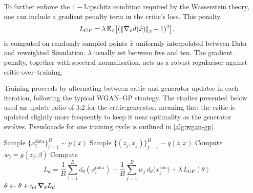 {{        To further enforce the \(1-\)Lipschitz condition required by the Wasserstein theory, one can include a gradient penalty term in the critic’s loss.
        This penalty,
        \[
            L_{GP} = \lambda\,\mathbb{E}_{\hat{x}}\qty[(\norm{\nabla_{\hat{x}}d(\hat{x})}_2 - 1)^2],
        \]
        is computed on randomly sampled points $\hat{x}$ uniformly interpolated between Data and reweighted Simulation.
        $\lambda$ usually set between five and ten.
        The gradient penalty, together with spectral normalisation, acts as a robust regulariser against critic over--training.

        Training proceeds by alternating between critic and generator updates in each iteration, following the typical WGAN--GP strategy.
        The studies presented below used an update ratio of 3:2 for the critic:generator, meaning that the critic is updated slightly more frequently to keep it near optimality as the generator evolves.
        Pseudocode for one training cycle is outlined in \cref{alg:wgan-gp}.

\begin{algorithm}
    \caption{WGAN GP Training Step}
    \label{alg:wgan-gp}
    \begin{algorithmic}
    \algospacing
      \State {}
        \State Sample $\{x_i^{\text{data}}\}_{i=1}^B\sim p(x)$
        \State Sample $\{(z_j, x_j)\}_{j=1}^B\sim q(z, x)$
        \State Compute $w_j = g(z_j;\beta)$
        \State Compute
        \[
          L_d
          = \frac1B\sum_{i=1}^B d_{\theta}(x_i^{\text{data}})
            -\frac1B\sum_{j=1}^B w_j\,d_{\theta}\bigl(x^{\text{sim}}_j\bigr)
            +\lambda\,L_{\text{GP}}(\theta)
        \]
        \State $\theta \leftarrow\theta + \eta_d\,\grad_{\theta}L_d$    
      \EndFor
    \EndFor
    \end{algorithmic}
\end{algorithm}

}}
